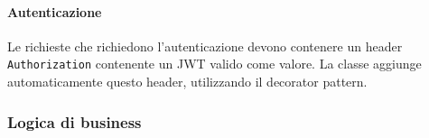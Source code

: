\documentclass[../../manuale-manutentore.tex]{subfiles}
\begin{document}
\paragraph{Autenticazione}%
\label{par:autenticazione}
Le richieste che richiedono l'autenticazione devono contenere un header \texttt{Authorization} contenente un JWT valido come valore.
La classe  aggiunge automaticamente questo header, utilizzando il decorator pattern.
\subsubsection{Logica di business}%
\label{subs:logica_di_business}

\end{document}
